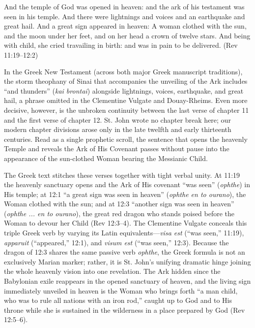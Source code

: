 \begin{scriptureblock}
And the temple of God was opened in heaven: and the ark of his testament was seen in his temple. And there were lightnings and voices and an earthquake and great hail. And a great sign appeared in heaven: A woman clothed with the sun, and the moon under her feet, and on her head a crown of twelve stars. And being with child, she cried travailing in birth: and was in pain to be delivered. \textnormal{(Rev 11:19--12:2)}
\end{scriptureblock}

In the Greek New Testament (across both major Greek manuscript traditions), the storm theophany of Sinai that accompanies the unveiling of the Ark includes ``and thunders'' (\textit{kai brontai}) alongside lightnings, voices, earthquake, and great hail, a phrase omitted in the Clementine Vulgate and Douay-Rheims. Even more decisive, however, is the unbroken continuity between the last verse of chapter 11 and the first verse of chapter 12. St. John wrote no chapter break here; our modern chapter divisions arose only in the late twelfth and early thirteenth centuries. Read as a single prophetic scroll, the sentence that opens the heavenly Temple and reveals the Ark of His Covenant passes without pause into the appearance of the sun-clothed Woman bearing the Messianic Child.

The Greek text stitches these verses together with tight verbal unity. At 11:19 the heavenly sanctuary opens and the Ark of His covenant ``was seen'' (\textit{ophthe}) in His temple; at 12:1 ``a great sign was seen in heaven'' (\textit{ophthe en to ourano}), the Woman clothed with the sun; and at 12:3 ``another sign was seen in heaven'' (\textit{ophthe ... en to ourano}), the great red dragon who stands poised before the Woman to devour her Child (Rev 12:3--4). The Clementine Vulgate conceals this triple Greek verb by varying its Latin equivalents---\textit{visa est} (``was seen,'' 11:19), \textit{apparuit} (``appeared,'' 12:1), and \textit{visum est} (``was seen,'' 12:3). Because the dragon of 12:3 shares the same passive verb \textit{ophthe}, the Greek formula is not an exclusively Marian marker; rather, it is St. John's unifying dramatic hinge joining the whole heavenly vision into one revelation. The Ark hidden since the Babylonian exile reappears in the opened sanctuary of heaven, and the living sign immediately unveiled in heaven is the Woman who brings forth ``a man child, who was to rule all nations with an iron rod,'' caught up to God and to His throne while she is sustained in the wilderness in a place prepared by God (Rev 12:5--6).


